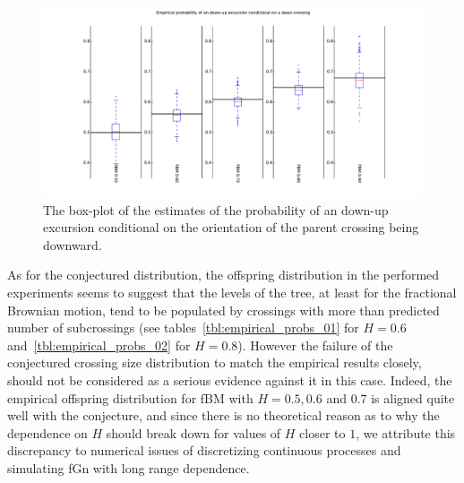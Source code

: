 \documentclass[a4paper]{article}
\begin{document}
\begin{figure}[htb]\begin{center}
    \includegraphics[width=6in]{images/fbm_fig_03_down-up_med_1000-21}
    \caption{The box-plot of the estimates of the probability of an down-up excursion
    conditional on the orientation of the parent crossing being downward.}
\label{fig:fbm_offspring_down_up}
\end{center}\end{figure}

As for the conjectured distribution, the offspring distribution in the performed
experiments seems to suggest that the levels of the tree, at least for the fractional
Brownian motion, tend to be populated by crossings with more than predicted number
of subcrossings (see tables~\ref{tbl:empirical_probs_01} for $H=0.6$
and~\ref{tbl:empirical_probs_02} for $H=0.8$). However the failure of the conjectured
crossing size distribution to match the empirical results closely, should not be
considered as a serious evidence against it in this case. Indeed, the empirical
offspring distribution for fBM with $H=0.5,0.6$ and $0.7$ is aligned quite well
with the conjecture, and since there is no theoretical reason as to why the
dependence on $H$ should break down for values of $H$ closer to $1$, we attribute
this discrepancy to numerical issues of discretizing continuous processes and
simulating fGn with long range dependence. 
\end{document}
